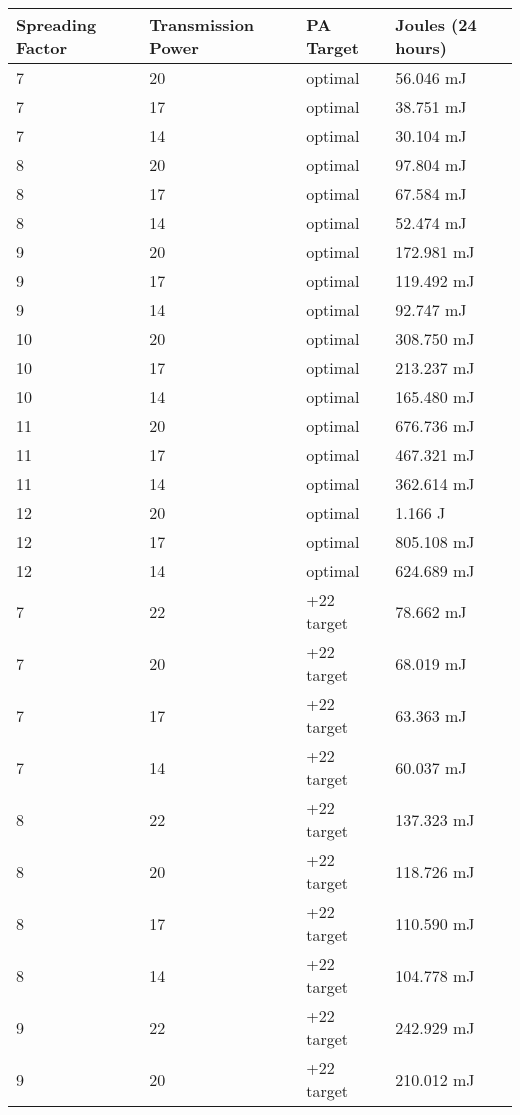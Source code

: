 \begin{table*}[ht]
    \centering
    \footnotesize
    \begin{tabularx}{\columnwidth}{l l l l}
        \toprule
        Spreading Factor & Transmission Power & PA Target & Joules (24 hours) \\
        \midrule
        7 & 20 & optimal & 56.046 mJ \\
        7 & 17 & optimal & 38.751 mJ \\
        7 & 14 & optimal & 30.104 mJ \\
        8 & 20 & optimal & 97.804 mJ \\
        8 & 17 & optimal & 67.584 mJ \\
        8 & 14 & optimal & 52.474 mJ \\
        9 & 20 & optimal & 172.981 mJ \\
        9 & 17 & optimal & 119.492 mJ \\
        9 & 14 & optimal & 92.747 mJ \\
        10 & 20 & optimal & 308.750 mJ \\
        10 & 17 & optimal & 213.237 mJ \\
        10 & 14 & optimal & 165.480 mJ \\
        11 & 20 & optimal & 676.736 mJ \\
        11 & 17 & optimal & 467.321 mJ \\
        11 & 14 & optimal & 362.614 mJ \\
        12 & 20 & optimal & 1.166 J \\
        12 & 17 & optimal & 805.108 mJ \\
        12 & 14 & optimal & 624.689 mJ \\
        \midrule
        7 & 22 & +22 target & 78.662 mJ \\
        7 & 20 & +22 target & 68.019 mJ \\
        7 & 17 & +22 target & 63.363 mJ \\
        7 & 14 & +22 target & 60.037 mJ \\
        8 & 22 & +22 target & 137.323 mJ \\
        8 & 20 & +22 target & 118.726 mJ \\
        8 & 17 & +22 target & 110.590 mJ \\
        8 & 14 & +22 target & 104.778 mJ \\
        9 & 22 & +22 target & 242.929 mJ \\
        9 & 20 & +22 target & 210.012 mJ \\

\end{tabularx}
\end{table*}
